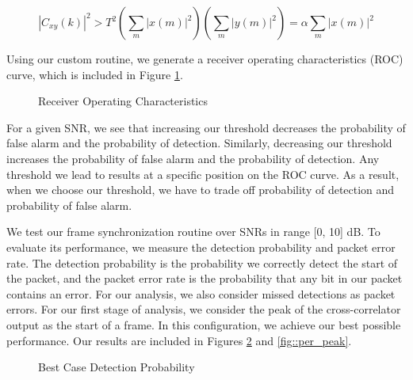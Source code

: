 \documentclass{article}
\begin{document}
\begin{equation}
	|C_{xy}(k)|^2 > T^2\left(\sum_m{|x(m)|^2}\right)\left(\sum_m{|y(m)|^2}\right) = \alpha\sum_m{|x(m)|^2}
\end{equation}

\noindent Using our custom routine, we generate a receiver operating characteristics (ROC) curve, which is included in Figure \ref{fig::roc_curve}.

\begin{figure}[H]
	\centerline{}
	\caption{Receiver Operating Characteristics}
	\label{fig::roc_curve}
\end{figure}

\noindent For a given SNR, we see that increasing our threshold decreases the probability of false alarm and the probability of detection. Similarly, decreasing our threshold increases the probability of false alarm and the probability of detection. Any threshold we lead to results at a specific position on the ROC curve. As a result, when we choose our threshold, we have to trade off probability of detection and probability of false alarm.

We test our frame synchronization routine over SNRs in range [0, 10] dB. To evaluate its performance, we measure the detection probability and packet error rate. The detection probability is the probability we correctly detect the start of the packet, and the packet error rate is the probability that any bit in our packet contains an error. For our analysis, we also consider missed detections as packet errors. For our first stage of analysis, we consider the peak of the cross-correlator output as the start of a frame. In this configuration, we achieve our best possible performance. Our results are included in Figures \ref{fig::detection_probability_peak} and \ref{fig::per_peak}.

\begin{figure}[H]
	\centerline{}
	\caption{Best Case Detection Probability}
	\label{fig::detection_probability_peak}
\end{figure}
\end{document}
